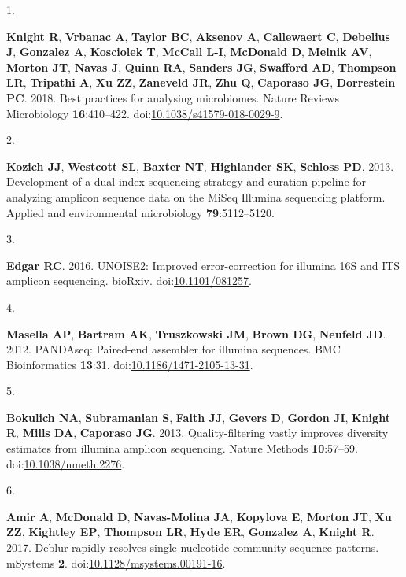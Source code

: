 \documentclass[
]{article}
\newlength{\cslhangindent}
\newlength{\csllabelwidth}
\newlength{\cslentryspacingunit} %
\newenvironment{CSLReferences}[2] %
 {%
  \setlength{\parindent}{0pt}
  \ifodd #1
  \let\oldpar\par
  \def\par{\hangindent=\cslhangindent\oldpar}
  \fi
  \setlength{\parskip}{#2\cslentryspacingunit}
 }%
 {}
\newcommand{\CSLLeftMargin}[1]{\parbox[t]{\csllabelwidth}{#1}}
\newcommand{\CSLRightInline}[1]{\parbox[t]{\linewidth - \csllabelwidth}{#1}\break}
\begin{document}
\hypertarget{refs}{}
\begin{CSLReferences}{0}{1}
\leavevmode{}%
\CSLLeftMargin{1. }%
\CSLRightInline{\textbf{Knight R}, \textbf{Vrbanac A}, \textbf{Taylor
BC}, \textbf{Aksenov A}, \textbf{Callewaert C}, \textbf{Debelius J},
\textbf{Gonzalez A}, \textbf{Kosciolek T}, \textbf{McCall L-I},
\textbf{McDonald D}, \textbf{Melnik AV}, \textbf{Morton JT},
\textbf{Navas J}, \textbf{Quinn RA}, \textbf{Sanders JG},
\textbf{Swafford AD}, \textbf{Thompson LR}, \textbf{Tripathi A},
\textbf{Xu ZZ}, \textbf{Zaneveld JR}, \textbf{Zhu Q}, \textbf{Caporaso
JG}, \textbf{Dorrestein PC}. 2018. Best practices for analysing
microbiomes. Nature Reviews Microbiology \textbf{16}:410--422.
doi:\href{https://doi.org/10.1038/s41579-018-0029-9}{10.1038/s41579-018-0029-9}.}

\leavevmode{}%
\CSLLeftMargin{2. }%
\CSLRightInline{\textbf{Kozich JJ}, \textbf{Westcott SL}, \textbf{Baxter
NT}, \textbf{Highlander SK}, \textbf{Schloss PD}. 2013. {Development of
a dual-index sequencing strategy and curation pipeline for analyzing
amplicon sequence data on the MiSeq Illumina sequencing platform}.
Applied and environmental microbiology \textbf{79}:5112--5120.}

\leavevmode{}%
\CSLLeftMargin{3. }%
\CSLRightInline{\textbf{Edgar RC}. 2016. {UNOISE}2: Improved
error-correction for illumina 16S and {ITS} amplicon sequencing.
bio{R}xiv. doi:\href{https://doi.org/10.1101/081257}{10.1101/081257}.}

\leavevmode{}%
\CSLLeftMargin{4. }%
\CSLRightInline{\textbf{Masella AP}, \textbf{Bartram AK},
\textbf{Truszkowski JM}, \textbf{Brown DG}, \textbf{Neufeld JD}. 2012.
{PANDAseq}: Paired-end assembler for illumina sequences. {BMC}
Bioinformatics \textbf{13}:31.
doi:\href{https://doi.org/10.1186/1471-2105-13-31}{10.1186/1471-2105-13-31}.}

\leavevmode{}%
\CSLLeftMargin{5. }%
\CSLRightInline{\textbf{Bokulich NA}, \textbf{Subramanian S},
\textbf{Faith JJ}, \textbf{Gevers D}, \textbf{Gordon JI}, \textbf{Knight
R}, \textbf{Mills DA}, \textbf{Caporaso JG}. 2013. Quality-filtering
vastly improves diversity estimates from illumina amplicon sequencing.
Nature Methods \textbf{10}:57--59.
doi:\href{https://doi.org/10.1038/nmeth.2276}{10.1038/nmeth.2276}.}

\leavevmode{}%
\CSLLeftMargin{6. }%
\CSLRightInline{\textbf{Amir A}, \textbf{McDonald D},
\textbf{Navas-Molina JA}, \textbf{Kopylova E}, \textbf{Morton JT},
\textbf{Xu ZZ}, \textbf{Kightley EP}, \textbf{Thompson LR}, \textbf{Hyde
ER}, \textbf{Gonzalez A}, \textbf{Knight R}. 2017. Deblur rapidly
resolves single-nucleotide community sequence patterns. {mSystems}
\textbf{2}.
doi:\href{https://doi.org/10.1128/msystems.00191-16}{10.1128/msystems.00191-16}.}


\end{CSLReferences}
\end{document}
